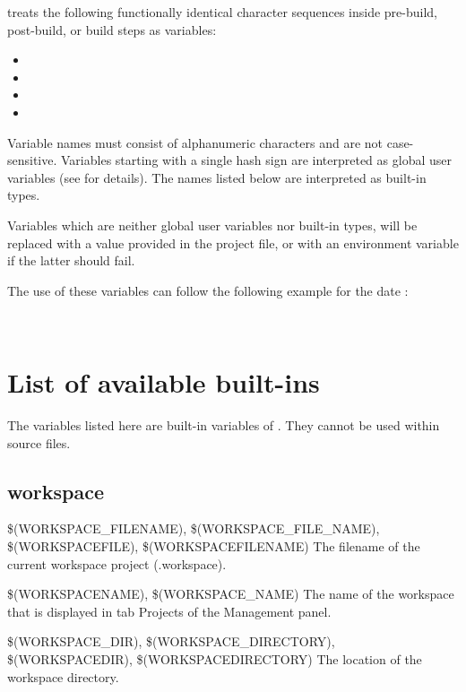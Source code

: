 \codeblocks treats the following functionally identical character sequences inside pre-build, post-build, or build steps as variables:

\begin{itemize}
\item {}
\item {}
\item {}
\item {}
\end{itemize}

Variable names must consist of alphanumeric characters and are not case-sensitive. Variables starting with a single hash sign \codeline{(#)} are interpreted as global user variables (see  for details). The names listed below are interpreted as built-in types.

Variables which are neither global user variables nor built-in types, will be replaced with a value provided in the project file, or with an environment variable if the latter should fail.

The use of these variables can follow the following example for the date :

 \\


\section{List of available built-ins}\label{sec:builtin_variables}

The variables listed here are built-in variables of \codeblocks. They cannot be used within source files.

\subsection{\codeblocks workspace}

\begin{codeentry}
\item[\$(WORKSPACE\_FILENAME), \$(WORKSPACE\_FILE\_NAME), \$(WORKSPACEFILE), \$(WORKSPACEFILENAME)] The filename of the current workspace project (.workspace).
\item[\$(WORKSPACENAME), \$(WORKSPACE\_NAME)] The name of the workspace that is displayed in tab Projects of the Management panel.
\item[\$(WORKSPACE\_DIR), \$(WORKSPACE\_DIRECTORY), \$(WORKSPACEDIR), \$(WORKSPACEDIRECTORY)] The location of the workspace directory.
\end{codeentry}

